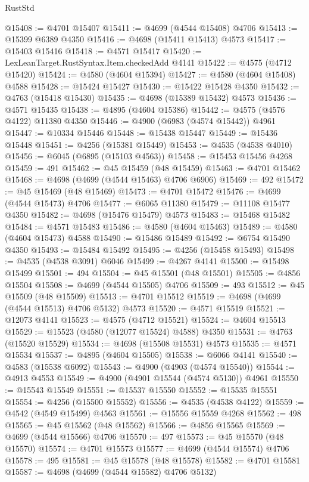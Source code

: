 \begin{lexlean}{RustStd}
\begin{coremodule}
@15408 := @4701 @15407
@15411 := @4699 (@4544 @15408) @4706
@15413 := @15399 @6389 @4350
@15416 := @4698 (@15411 @15413) @4573
@15417 := @15403 @15416
@15418 := @4571 @15417
@15420 := LexLeanTarget.RustSyntax.Item.checkedAdd @4141
@15422 := @4575 (@4712 @15420)
@15424 := @4580 (@4604 @15394)
@15427 := @4580 (@4604 @15408) @4588
@15428 := @15424 @15427
@15430 := @15422 @15428 @4350
@15432 := @4763 (@15418 @15430)
@15435 := @4698 (@15389 @15432) @4573
@15436 := @4571 @15435
@15438 := @4895 (@4604 @15386)
@15442 := @4575 (@4576 @4122) @11380 @4350
@15446 := @4900 (@6983 (@4574 @15442)) @4961
@15447 := @10334 @15446
@15448 := @15438 @15447
@15449 := @15436 @15448
@15451 := @4256 (@15381 @15449)
@15453 := @4535 (@4538 @4010)
@15456 := @6045 (@6895 (@15103 @4563))
@15458 := @15453 @15456 @4268
@15459 := 491
@15462 := @45 @15459 (@48 @15459)
@15463 := @4701 @15462
@15468 := @4698 (@4699 (@4544 @15463) @4706 @6906)
@15469 := 492
@15472 := @45 @15469 (@48 @15469)
@15473 := @4701 @15472
@15476 := @4699 (@4544 @15473) @4706
@15477 := @6065 @11380
@15479 := @11108 @15477 @4350
@15482 := @4698 (@15476 @15479) @4573
@15483 := @15468 @15482
@15484 := @4571 @15483
@15486 := @4580 (@4604 @15463)
@15489 := @4580 (@4604 @15473) @4588
@15490 := @15486 @15489
@15492 := @6754 @15490 @4350
@15493 := @15484 @15492
@15495 := @4256 (@15458 @15493)
@15498 := @4535 (@4538 @3091) @6046
@15499 := @4267 @4141
@15500 := @15498 @15499
@15501 := 494
@15504 := @45 @15501 (@48 @15501)
@15505 := @4856 @15504
@15508 := @4699 (@4544 @15505) @4706
@15509 := 493
@15512 := @45 @15509 (@48 @15509)
@15513 := @4701 @15512
@15519 := @4698 (@4699 (@4544 @15513) @4706 @5132) @4573
@15520 := @4571 @15519
@15521 := @12073 @4141
@15523 := @4575 (@4712 @15521)
@15524 := @4604 @15513
@15529 := @15523 (@4580 (@12077 @15524) @4588) @4350
@15531 := @4763 (@15520 @15529)
@15534 := @4698 (@15508 @15531) @4573
@15535 := @4571 @15534
@15537 := @4895 (@4604 @15505)
@15538 := @6066 @4141
@15540 := @4583 (@15538 @6092)
@15543 := @4900 (@4903 (@4574 @15540))
@15544 := @4913 @4553
@15549 := @4900 (@4901 @15544 (@4574 @5130)) @4961
@15550 := @15543 @15549
@15551 := @15537 @15550
@15552 := @15535 @15551
@15554 := @4256 (@15500 @15552)
@15556 := @4535 (@4538 @4122)
@15559 := @4542 (@4549 @15499) @4563
@15561 := @15556 @15559 @4268
@15562 := 498
@15565 := @45 @15562 (@48 @15562)
@15566 := @4856 @15565
@15569 := @4699 (@4544 @15566) @4706
@15570 := 497
@15573 := @45 @15570 (@48 @15570)
@15574 := @4701 @15573
@15577 := @4699 (@4544 @15574) @4706
@15578 := 495
@15581 := @45 @15578 (@48 @15578)
@15582 := @4701 @15581
@15587 := @4698 (@4699 (@4544 @15582) @4706 @5132)

\end{coremodule}
\end{lexlean}
